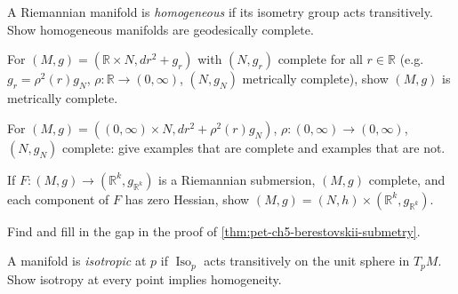 \begin{remark}
  \label{rem:pet-ch5-ex-9}
  A Riemannian manifold is \emph{homogeneous} if its isometry group acts
  transitively. Show homogeneous manifolds are geodesically complete.
\end{remark}

\begin{remark}
  \label{rem:pet-ch5-ex-10}
  For $(M,g)=(\mathbb R\times N,dr^2+g_r)$ with $(N,g_r)$ complete for all
  $r\in\mathbb R$ (e.g.\ $g_r=\rho^2(r)g_N$, $\rho:\mathbb R\to(0,\infty)$, $(N,g_N)$
  metrically complete), show $(M,g)$ is metrically complete.
\end{remark}

\begin{remark}
  \label{rem:pet-ch5-ex-11}
  For $(M,g)=((0,\infty)\times N,dr^2+\rho^2(r)g_N)$, $\rho:(0,\infty)\to
  (0,\infty)$, $(N,g_N)$ complete: give examples that are complete and examples
  that are not.
\end{remark}

\begin{remark}
  \label{rem:pet-ch5-ex-12}
  If $F:(M,g)\to(\mathbb R^k,g_{\mathbb R^k})$ is a Riemannian submersion, $(M,g)$
  complete, and each component of $F$ has zero Hessian, show
  $(M,g)=(N,h)\times(\mathbb R^k,g_{\mathbb R^k})$.
\end{remark}

\begin{remark}
  \label{rem:pet-ch5-ex-13}
  Find and fill in the gap in the proof of \cref{thm:pet-ch5-berestovskii-submetry}.
\end{remark}

\begin{remark}
  \label{rem:pet-ch5-ex-14}
  A manifold is \emph{isotropic} at $p$ if $\operatorname{Iso}_p$ acts transitively
  on the unit sphere in $T_pM$. Show isotropy at every point implies homogeneity.
\end{remark}

